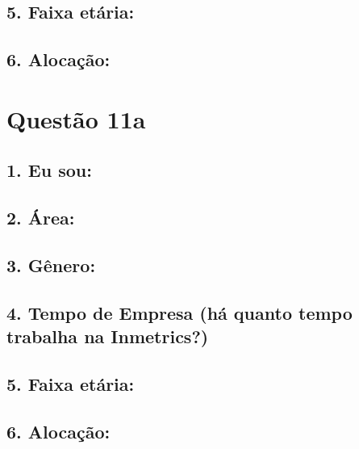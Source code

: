 \documentclass[]{book}
\begin{document}
\hypertarget{faixa-etaria-11}{%
\subsection{5. Faixa etária:}\label{faixa-etaria-11}}

\hypertarget{alocacao-11}{%
\subsection{6. Alocação:}\label{alocacao-11}}

\hypertarget{questao-11a}{%
\section{Questão 11a}\label{questao-11a}}

\hypertarget{eu-sou-12}{%
\subsection{1. Eu sou:}\label{eu-sou-12}}

\hypertarget{area-12}{%
\subsection{2. Área:}\label{area-12}}

\hypertarget{genero-12}{%
\subsection{3. Gênero:}\label{genero-12}}

\hypertarget{tempo-de-empresa-ha-quanto-tempo-trabalha-na-inmetrics-12}{%
\subsection{4. Tempo de Empresa (há quanto tempo trabalha na Inmetrics?)}\label{tempo-de-empresa-ha-quanto-tempo-trabalha-na-inmetrics-12}}

\hypertarget{faixa-etaria-12}{%
\subsection{5. Faixa etária:}\label{faixa-etaria-12}}

\hypertarget{alocacao-12}{%
\subsection{6. Alocação:}\label{alocacao-12}}
\end{document}
